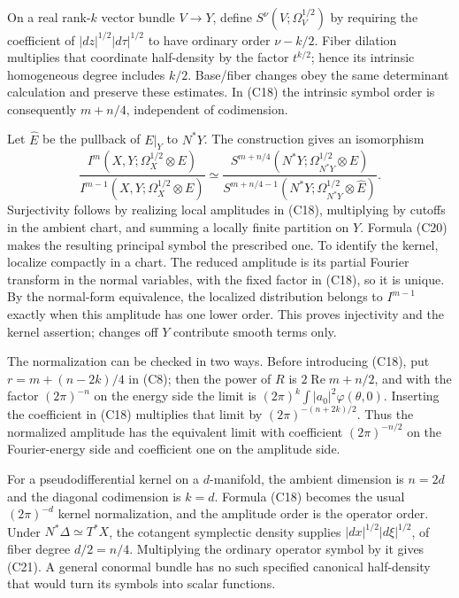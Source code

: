 \documentclass[
  11pt,
]{article}
\begin{document}
On a real rank-\(k\) vector bundle \(V\to Y\), define
\(S^\nu(V;\Omega_V^{1/2})\) by requiring the coefficient of
\(|dz|^{1/2}|d\tau|^{1/2}\) to have ordinary order \(\nu-k/2\). Fiber
dilation multiplies that coordinate half-density by the factor
\(t^{k/2}\); hence its intrinsic homogeneous degree includes \(k/2\).
Base/fiber changes obey the same determinant calculation and preserve
these estimates. In (C18) the intrinsic symbol order is consequently
\(m+n/4\), independent of codimension.

Let \(\widehat E\) be the pullback of \(E|_Y\) to \(N^*Y\). The
construction gives an isomorphism \[
\frac{I^m(X,Y;\Omega_X^{1/2}\otimes E)}{I^{m-1}(X,Y;\Omega_X^{1/2}\otimes E)}
\simeq
\frac{S^{m+n/4}(N^*Y;\Omega_{N^*Y}^{1/2}\otimes\widehat E)}
{S^{m+n/4-1}(N^*Y;\Omega_{N^*Y}^{1/2}\otimes\widehat E)}.
\tag{C21}
\] Surjectivity follows by realizing local amplitudes in (C18),
multiplying by cutoffs in the ambient chart, and summing a locally
finite partition on \(Y\). Formula (C20) makes the resulting principal
symbol the prescribed one. To identify the kernel, localize compactly in
a chart. The reduced amplitude is its partial Fourier transform in the
normal variables, with the fixed factor in (C18), so it is unique. By
the normal-form equivalence, the localized distribution belongs to
\(I^{m-1}\) exactly when this amplitude has one lower order. This proves
injectivity and the kernel assertion; changes off \(Y\) contribute
smooth terms only.

The normalization can be checked in two ways. Before introducing (C18),
put \(r=m+(n-2k)/4\) in (C8); then the power of \(R\) is
\(2\operatorname{Re}m+n/2\), and with the factor \((2\pi)^{-n}\) on the
energy side the limit is \((2\pi)^k\int|a_0|^2\varphi(\theta,0)\).
Inserting the coefficient in (C18) multiplies that limit by
\((2\pi)^{-(n+2k)/2}\). Thus the normalized amplitude has the equivalent
limit with coefficient \((2\pi)^{-n/2}\) on the Fourier-energy side and
coefficient one on the amplitude side.

For a pseudodifferential kernel on a \(d\)-manifold, the ambient
dimension is \(n=2d\) and the diagonal codimension is \(k=d\). Formula
(C18) becomes the usual \((2\pi)^{-d}\) kernel normalization, and the
amplitude order is the operator order. Under \(N^*\Delta\simeq T^*X\),
the cotangent symplectic density supplies \(|dx|^{1/2}|d\xi|^{1/2}\), of
fiber degree \(d/2=n/4\). Multiplying the ordinary operator symbol by it
gives (C21). A general conormal bundle has no such specified canonical
half-density that would turn its symbols into scalar functions.
\end{document}
